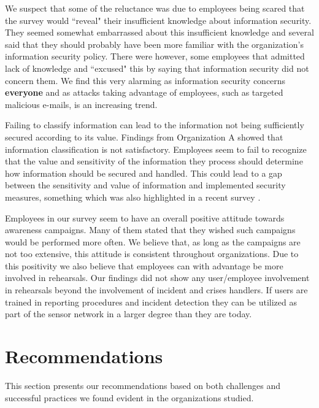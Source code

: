 We suspect that some of the reluctance was due to employees being scared that the survey would ``reveal" their insufficient knowledge about information security. They seemed somewhat embarrassed about this insufficient knowledge and several said that they should probably have been more familiar with the organization's information security policy. There were however, some employees that admitted lack of knowledge and ``excused" this by saying that information security did not concern them. We find this very alarming as information security concerns \textbf{everyone} and as attacks taking advantage of employees, such as targeted malicious e-mails, is an increasing trend. 

Failing to classify information can lead to the information not being sufficiently secured according to its value. Findings from Organization A showed that information classification is not satisfactory. Employees seem to fail to recognize that the value and sensitivity of the information they process should determine how information should be secured and handled. This could lead to a gap between the sensitivity and value of information and implemented security measures, something which was also highlighted in a recent survey \cite{Morketall2012}.

Employees in our survey seem to have an overall positive attitude towards awareness campaigns. Many of them stated that they wished such campaigns would be performed more often. We believe that, as long as the campaigns are not too extensive, this attitude is consistent throughout organizations. Due to this positivity we also believe that employees can with advantage be more involved in rehearsals. Our findings did not show any user/employee involvement in rehearsals beyond the involvement of incident and crises handlers. If users are trained in reporting procedures and incident detection they can be utilized as part of the sensor network in a larger degree than they are today.

\section{Recommendations}
\label{sec:rec}
This section presents our recommendations based on both challenges and successful practices we found evident in the organizations studied.

